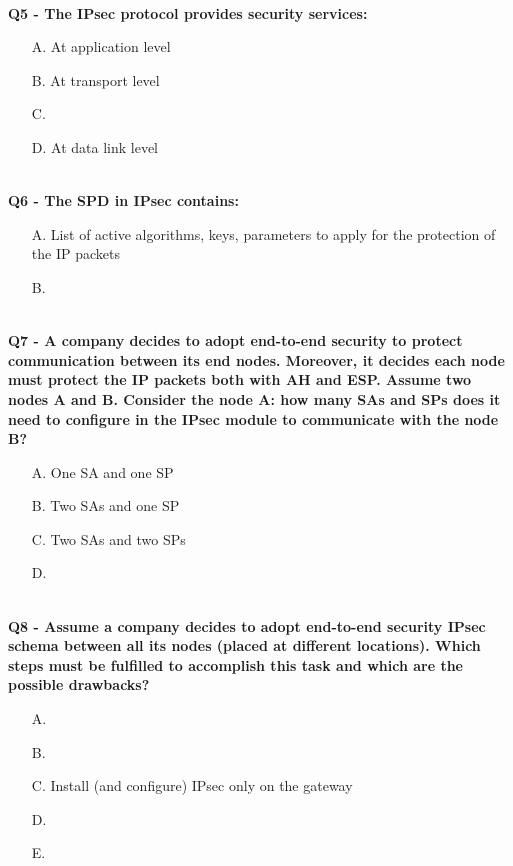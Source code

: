\textbf{\\Q5 - The IPsec protocol provides security services:}
\begin{itemize}
    \item[A.] At application level
    \item[B.] At transport level
    \item[C.] 
    \item[D.] At data link level
\end{itemize}

\textbf{\\Q6 - The SPD in IPsec contains:}
\begin{itemize}
    \item[A.] List of active algorithms, keys, parameters to apply for the protection of the IP packets
    \item[B.] 
\end{itemize}

\textbf{\\Q7 - A company decides to adopt end-to-end security to protect communication between its end nodes. Moreover, it decides each node must protect the IP packets both with AH and ESP. Assume two nodes A and B. Consider the node A: how many SAs and SPs does it need to configure in the IPsec module to communicate with the node B?}
\begin{itemize}
    \item[A.] One SA and one SP
    \item[B.] Two SAs and one SP
    \item[C.] Two SAs and two SPs
    \item[D.] 
\end{itemize}

\textbf{\\Q8 - Assume a company decides to adopt end-to-end security IPsec schema between all its nodes (placed at different locations). 
Which steps must be fulfilled to accomplish this task and which are the possible drawbacks?}
\begin{itemize}
    \item[A.] 
    \item[B.] 
    \item[C.] Install (and configure) IPsec only on the gateway
    \item[D.] 
    \item[E.] 
\end{itemize}

